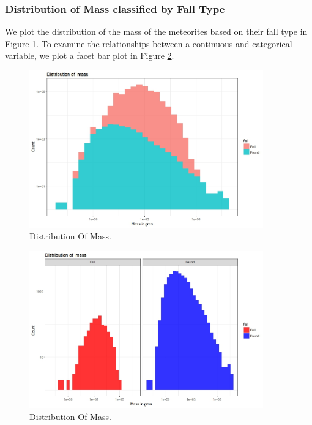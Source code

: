 \subsubsection{Distribution of Mass classified by Fall Type}
We plot the distribution of the mass of the meteorites based on their fall type in Figure \ref{fig:fig11}. To examine the relationships between a continuous and categorical variable, we plot a facet bar plot in Figure \ref{fig:fig12}.
\begin{figure}
	\centering
	\includegraphics[width=0.9\textwidth]{Figures/11DistributionOfMass.jpeg}
	\caption{\label{fig:fig11} Distribution Of Mass.}
\end{figure}
\begin{figure}
	\centering
	\includegraphics[width=0.9\textwidth]{Figures/12DistributionOfMass.jpeg}
	\caption{\label{fig:fig12}  Distribution Of Mass.}
\end{figure}

